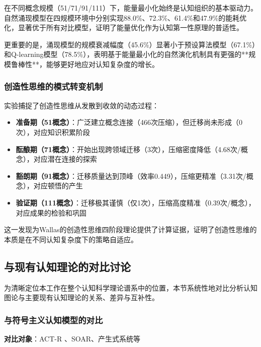 \documentclass[12pt,a4paper]{article}
\begin{document}
在不同概念规模（51/71/91/111）下，能量最小化始终是认知组织的基本驱动力。自然涌现模型在四规模环境中分别实现88.0\%、72.3\%、61.4\%和47.9\%的能耗优化，显著优于所有对比模型，证明了能量优化作为认知第一性原理的普适性。

更重要的是，涌现模型的规模衰减幅度（45.6\%）显著小于预设算法模型（67.1\%）和Q-learning模型（78.5\%），表明基于能量最小化的自然演化机制具有更强的**规模鲁棒性**，能够更好地应对认知复杂度的增长。

\subsubsection{创造性思维的模式转变机制}

实验捕捉了创造性思维从发散到收敛的动态过程：
\begin{itemize}
\item \textbf{准备期（51概念）}：广泛建立概念连接（466次压缩），但迁移尚未形成（0次），对应知识积累阶段
\item \textbf{酝酿期（71概念）}：开始出现跨领域迁移（3次），压缩密度降低（4.68次/概念），对应潜在连接的探索
\item \textbf{豁朗期（91概念）}：迁移质量达到顶峰（效率0.449），压缩更精准（3.31次/概念），对应顿悟的产生
\item \textbf{验证期（111概念）}：迁移极其谨慎（仅1次），压缩高度精准（0.39次/概念），对应成果的检验和巩固
\end{itemize}

这一发现为Wallas的创造性思维四阶段理论提供了计算证据，证明了创造性思维的本质是在不同认知复杂度下的策略自适应。

\subsection{与现有认知理论的对比讨论}
\label{subsec:comparison_existing_theories}

为清晰定位本工作在整个认知科学理论谱系中的位置，本节系统性地对比分析认知图论与主要现有认知理论的关系、差异与互补性。

\subsubsection{与符号主义认知模型的对比}
\label{subsubsec:vs_symbolic_models}

\textbf{对比对象}：ACT-R \cite{anderson2004act}、SOAR、产生式系统等
\end{document}
